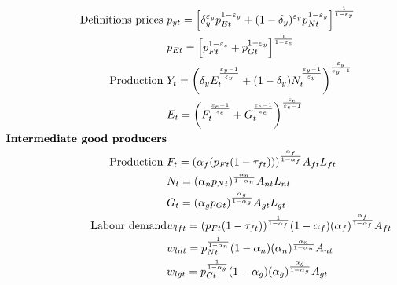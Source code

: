 \begin{align*}
\text{Definitions prices}\ \vspace{4mm}&
p_{yt}= \left[\delta_y^{\varepsilon_y}p_{Et}^{1-\varepsilon_y}+(1-\delta_y)^{\varepsilon_y}p_{Nt}^{1-\varepsilon_y}\right]^\frac{1}{1-\varepsilon_y}\\
& p_{Et}= \left[p_{{F}t}^{1-\varepsilon_e}+p_{Gt}^{1-\varepsilon_y}\right]^\frac{1}{1-\varepsilon_e}\\
\text{Production}\ \vspace{4mm}& 
Y_t=\left(\delta_yE_t^\frac{\varepsilon_y-1}{\varepsilon_y}+(1-\delta_y)N_t^\frac{\varepsilon_y-1}{\varepsilon_y}\right)^\frac{\varepsilon_y}{\varepsilon_y-1}\\
&E_t=\left({F}_t^\frac{\varepsilon_e-1}{\varepsilon_e}+G_t^\frac{\varepsilon_e-1}{\varepsilon_e}\right)^\frac{\varepsilon_e}{\varepsilon_e-1}\\
\text{\textbf{Intermediate good producers}}&\\
\text{Production}\ \vspace{4mm}& F_t= (\alpha_f(p_{Ft}(1-\tau_{ft})))^\frac{ \alpha_f}{1-\alpha_f}A_{ft}L_{ft}\\
&N_t= (\alpha_np_{Nt})^\frac{ \alpha_n}{1-\alpha_n}A_{nt}L_{nt}\\
&G_t= (\alpha_gp_{Gt})^\frac{ \alpha_g}{1-\alpha_g}A_{gt}L_{gt}\\
%
\text{Labour demand}%
& w_{lft}=(p_{Ft}(1-\tau_{ft}))^\frac{1}{1-\alpha_f}(1-\alpha_f)(\alpha_f)^\frac{\alpha_f}{1-\alpha_f}A_{ft}\\
& w_{lnt}=p_{Nt}^\frac{1}{1-\alpha_n}(1-\alpha_n)(\alpha_n)^\frac{\alpha_n}{1-\alpha_n}A_{nt}\\
& w_{lgt}=p_{Gt}^\frac{1}{1-\alpha_g}(1-\alpha_g)(\alpha_g)^\frac{\alpha_g}{1-\alpha_g}A_{gt}

\end{align*}
